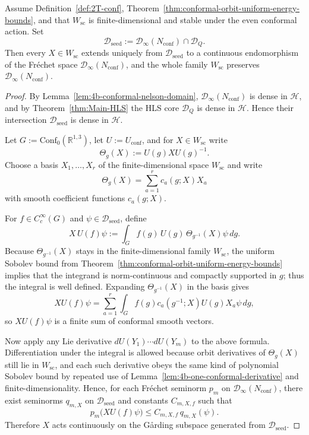 \begin{lemma}
\label{lem:4b-smooth-vector-transfer}
Assume Definition~\ref{def:2T-conf},
Theorem~\ref{thm:conformal-orbit-uniform-energy-bounds}, and that
\(W_{\mathrm{sc}}\) is finite-dimensional and stable under the even conformal
action. Set
\[
\mathcal D_{\mathrm{seed}}
:=
\mathcal D_\infty(N_{\mathrm{conf}})\cap\mathcal D_Q.
\]
Then every \(X\in W_{\mathrm{sc}}\) extends uniquely from
\(\mathcal D_{\mathrm{seed}}\) to a continuous endomorphism of the Fr\'echet
space \(\mathcal D_\infty(N_{\mathrm{conf}})\), and the whole family
\(W_{\mathrm{sc}}\) preserves \(\mathcal D_\infty(N_{\mathrm{conf}})\).
\end{lemma}

\begin{proof}
By Lemma~\ref{lem:4b-conformal-nelson-domain},
\(\mathcal D_\infty(N_{\mathrm{conf}})\) is dense in \(\mathcal H\), and by
Theorem~\ref{thm:Main-HLS} the HLS core \(\mathcal D_Q\) is dense in \(\mathcal H\).
Hence their intersection \(\mathcal D_{\mathrm{seed}}\) is dense in \(\mathcal H\).

Let \(G:=\mathrm{Conf}_0(\mathbb R^{1,3})\), let \(U:=U_{\mathrm{conf}}\), and for
\(X\in W_{\mathrm{sc}}\) write
\[
\Theta_g(X):=U(g)XU(g)^{-1}.
\]
Choose a basis \(X_1,\dots,X_r\) of the finite-dimensional space \(W_{\mathrm{sc}}\)
and write
\[
\Theta_g(X)=\sum_{a=1}^r c_a(g;X)X_a
\]
with smooth coefficient functions \(c_a(g;X)\).

For \(f\in C_c^\infty(G)\) and \(\psi\in\mathcal D_{\mathrm{seed}}\), define
\[
X\,U(f)\psi
:=
\int_G f(g)\,U(g)\,\Theta_{g^{-1}}(X)\psi\,dg.
\]
Because \(\Theta_{g^{-1}}(X)\) stays in the finite-dimensional family
\(W_{\mathrm{sc}}\), the uniform Sobolev bound from
Theorem~\ref{thm:conformal-orbit-uniform-energy-bounds} implies that the
integrand is norm-continuous and compactly supported in \(g\); thus the integral
is well defined. Expanding \(\Theta_{g^{-1}}(X)\) in the basis gives
\[
XU(f)\psi
=
\sum_{a=1}^r\int_G f(g)c_a(g^{-1};X)U(g)X_a\psi\,dg,
\]
so \(XU(f)\psi\) is a finite sum of conformal smooth vectors.

Now apply any Lie derivative \(dU(Y_1)\cdots dU(Y_m)\) to the above formula.
Differentiation under the integral is allowed because orbit derivatives of
\(\Theta_g(X)\) still lie in \(W_{\mathrm{sc}}\), and each such derivative obeys
the same kind of polynomial Sobolev bound by repeated use of
Lemma~\ref{lem:4b-one-conformal-derivative} and finite-dimensionality. Hence, for
each Fr\'echet seminorm \(p_m\) on \(\mathcal D_\infty(N_{\mathrm{conf}})\), there
exist seminorms \(q_{m,X}\) on \(\mathcal D_{\mathrm{seed}}\) and constants
\(C_{m,X,f}\) such that
\[
p_m\bigl(XU(f)\psi\bigr)
\le
C_{m,X,f}\,q_{m,X}(\psi).
\]
Therefore \(X\) acts continuously on the G\r{a}rding subspace generated from
\(\mathcal D_{\mathrm{seed}}\).


\end{proof}
